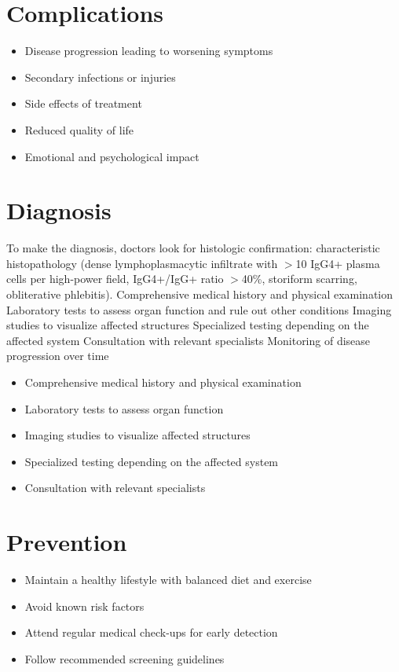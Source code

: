 \section{Complications}
\begin{itemize}[noitemsep]
  \item Disease progression leading to worsening symptoms
  \item Secondary infections or injuries
  \item Side effects of treatment
  \item Reduced quality of life
  \item Emotional and psychological impact
\end{itemize}
\section{Diagnosis}
To make the diagnosis, doctors look for histologic confirmation: characteristic histopathology (dense lymphoplasmacytic infiltrate with $>$10 IgG4+ plasma cells per high-power field, IgG4+/IgG+ ratio $>$40\%, storiform scarring, obliterative phlebitis). Comprehensive medical history and physical examination Laboratory tests to assess organ function and rule out other conditions Imaging studies to visualize affected structures Specialized testing depending on the affected system Consultation with relevant specialists Monitoring of disease progression over time

\begin{itemize}[noitemsep]
  \item Comprehensive medical history and physical examination
  \item Laboratory tests to assess organ function
  \item Imaging studies to visualize affected structures
  \item Specialized testing depending on the affected system
  \item Consultation with relevant specialists
\end{itemize}
\section{Prevention}
\begin{itemize}[noitemsep]
  \item Maintain a healthy lifestyle with balanced diet and exercise
  \item Avoid known risk factors
  \item Attend regular medical check-ups for early detection
  \item Follow recommended screening guidelines
\end{itemize}
